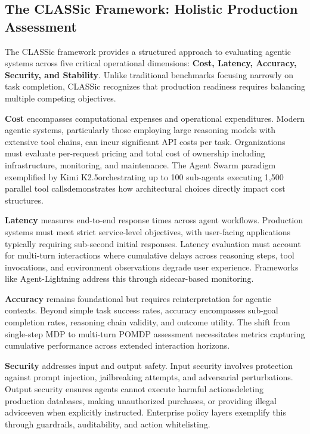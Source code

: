 \subsection{The CLASSic Framework: Holistic Production Assessment}

The CLASSic framework provides a structured approach to evaluating agentic systems across five critical operational dimensions: \textbf{Cost, Latency, Accuracy, Security, and Stability}. Unlike traditional benchmarks focusing narrowly on task completion, CLASSic recognizes that production readiness requires balancing multiple competing objectives.

\textbf{Cost} encompasses computational expenses and operational expenditures. Modern agentic systems, particularly those employing large reasoning models with extensive tool chains, can incur significant API costs per task. Organizations must evaluate per-request pricing and total cost of ownership including infrastructure, monitoring, and maintenance. The Agent Swarm paradigm exemplified by Kimi K2.5orchestrating up to 100 sub-agents executing 1,500 parallel tool callsdemonstrates how architectural choices directly impact cost structures.

\textbf{Latency} measures end-to-end response times across agent workflows. Production systems must meet strict service-level objectives, with user-facing applications typically requiring sub-second initial responses. Latency evaluation must account for multi-turn interactions where cumulative delays across reasoning steps, tool invocations, and environment observations degrade user experience. Frameworks like Agent-Lightning address this through sidecar-based monitoring.

\textbf{Accuracy} remains foundational but requires reinterpretation for agentic contexts. Beyond simple task success rates, accuracy encompasses sub-goal completion rates, reasoning chain validity, and outcome utility. The shift from single-step MDP to multi-turn POMDP assessment necessitates metrics capturing cumulative performance across extended interaction horizons.

\textbf{Security} addresses input and output safety. Input security involves protection against prompt injection, jailbreaking attempts, and adversarial perturbations. Output security ensures agents cannot execute harmful actionsdeleting production databases, making unauthorized purchases, or providing illegal adviceeven when explicitly instructed. Enterprise policy layers exemplify this through guardrails, auditability, and action whitelisting.

